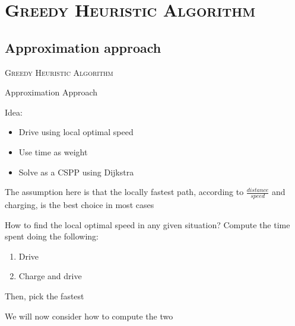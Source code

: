 \section{\scshape Greedy Heuristic Algorithm}

\subsection{Approximation approach}

\begin{frame}
\center \huge \scshape Greedy Heuristic Algorithm
\end{frame}

\begin{frame}{Approximation Approach}

  Idea:
  \begin{itemize}
    \item Drive using local optimal speed
    \item Use time as weight
    \item Solve as a CSPP using Dijkstra
  \end{itemize}
  The assumption here is that the locally fastest path, according to $\frac{distance}{speed}$ and charging, is the best choice in most cases
\end{frame}

\begin{frame}
  How to find the local optimal speed in any given situation?
  Compute the time spent doing the following:
  \begin{enumerate}
    \item Drive
    \item Charge and drive
  \end{enumerate}
  Then, pick the fastest

  We will now consider how to compute the two

\end{frame}
